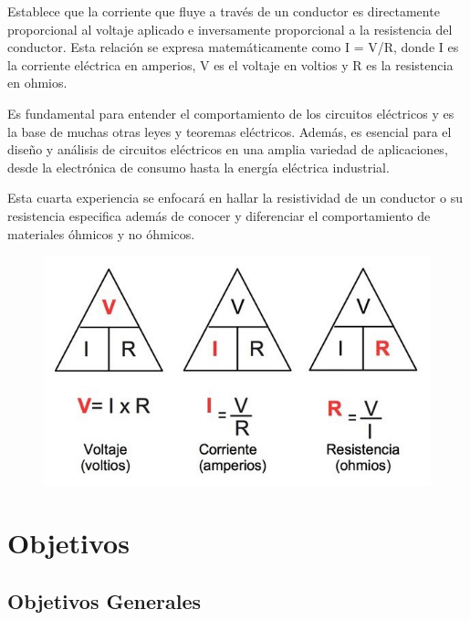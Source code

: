 \documentclass[letterpaper, 12pt]{report}
\begin{document}
\bigskip

Establece que la corriente que fluye a través de un conductor
es directamente proporcional al voltaje aplicado e inversamente proporcional
a la resistencia del conductor. Esta relación se expresa matemáticamente como
I = V/R, donde I es la corriente eléctrica en amperios, V es el voltaje
en voltios y R es la resistencia en ohmios.

\bigskip

Es fundamental para entender el comportamiento de los circuitos
eléctricos y es la base de muchas otras leyes y teoremas eléctricos.
Además, es esencial para el diseño y análisis de circuitos eléctricos
en una amplia variedad de aplicaciones, desde la electrónica de consumo
hasta la energía eléctrica industrial.

\bigskip

Esta cuarta experiencia se enfocará en hallar la resistividad de un conductor
o su resistencia especifica además de conocer y diferenciar el comportamiento
de materiales óhmicos y no óhmicos.

\begin{figure}[H]
	\begin{center}
		\includegraphics[scale = 0.5]{./Images/LeyDeOhm.jpg}
	\end{center}
\end{figure}

\newpage

\section{Objetivos}

\subsection{Objetivos Generales}
\end{document}
